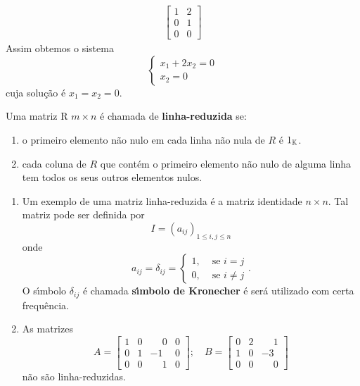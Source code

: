 \begin{exemplo}
\begin{enumerate}[label={\arabic*})]
\begin{align*}
				\left[
					\begin{array}{cc}
						1 & 2\\
						0 & 1\\
						0 & 0
					\end{array}
				\right]
		\end{align*}
		Assim obtemos o sistema
		\[
			\begin{cases}
				x_1 + 2x_2 = 0\\
				x_2 = 0
			\end{cases}
		\]
		cuja solu\c{c}\~ao \'e $x_1 = x_2 = 0$.
	\end{enumerate}
\end{exemplo}

\begin{definicao}\label{linhareduzida}
	Uma matriz R $m \times n$ \'e chamada de \textbf{linha-reduzida} se:
	\begin{enumerate}[label={\roman*})]
		\item o primeiro elemento n\~ao nulo em cada linha n\~ao nula de $R$ \'e $1_{\mathbb{K}}$.
		\item cada coluna de $R$ que cont\'em o primeiro elemento n\~ao nulo de alguma linha tem todos os seus outros elementos nulos.
	\end{enumerate}
\end{definicao}

\begin{exemplo}
	\begin{enumerate}[label={\arabic*})]
		\item Um exemplo de uma matriz linha-reduzida \'e a matriz identidade $n \times n$. Tal matriz pode ser definida por
		\[
			I = (a_{ij})_{1 \le i,j \le n}
		\]
		onde
		\[
			a_{ij} = \delta_{ij} =
			\begin{cases}
				1, & \mbox{ se } i = j\\
				0, & \mbox{ se } i \ne j
			\end{cases}.
		\]
		O s{\'\i}mbolo $\delta_{ij}$ \'e chamada \textbf{s{\'\i}mbolo de Kronecher} \'e ser\'a utilizado com certa frequ\^encia.
		\item As matrizes
		\[
			A =
			\begin{bmatrix}
				1 & 0 & \phantom{-}0 & 0\\
				0 & 1 & -1 & 0\\
				0 & 0 & \phantom{-}1 & 0
			\end{bmatrix};\quad
			B =
			\begin{bmatrix}
				0 & 2 & \phantom{-}1\\
				1 & 0 & -3\\
				0 & 0 & \phantom{-}0
			\end{bmatrix}
		\]
		n\~ao s\~ao linha-reduzidas.
	\end{enumerate}
\end{exemplo}

